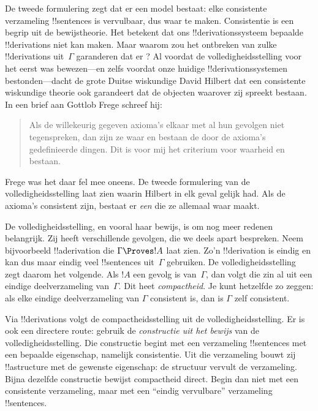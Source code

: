 \documentclass[openany]{memoir}
\begin{document}
De tweede formulering zegt dat er een model bestaat: elke consistente
verzameling !!{sentence}s is vervulbaar, dus waar te maken.
Consistentie is een begrip uit de bewijstheorie. Het betekent dat ons
!!{derivation}ssysteem bepaalde !!{derivation}s niet kan maken. Maar
waarom zou het ontbreken van zulke !!{derivation}s uit~$\Gamma$
garanderen dat er
? Al voordat
de volledigheidsstelling voor het eerst was bewezen---en zelfs voordat
onze huidige !!{derivation}ssystemen bestonden---dacht de grote Duitse
wiskundige David Hilbert dat een consistente wiskundige theorie ook
garandeert dat de objecten waarover zij spreekt bestaan. In een brief
aan Gottlob Frege schreef hij:
\begin{quote}
  Als de willekeurig gegeven axioma's elkaar met al hun gevolgen niet
  tegenspreken, dan zijn ze waar en bestaan de door de axioma's
  gedefinieerde dingen. Dit is voor mij het criterium voor waarheid en
  bestaan.
\end{quote}
Frege was het daar fel mee oneens. De tweede formulering van de
volledigheidsstelling laat zien waarin Hilbert in elk geval gelijk had.
Als de axioma's consistent zijn, bestaat er \emph{een}
 die ze allemaal waar maakt.

De volledigheidsstelling, en vooral haar bewijs, is om nog meer redenen
belangrijk. Zij heeft verschillende gevolgen, die we deels apart
bespreken. Neem bijvoorbeeld !!a{derivation} die
$\Gamma \Proves !A$ laat zien. Zo'n !!{derivation} is eindig en kan dus
maar eindig veel !!{sentence}s uit~$\Gamma$ gebruiken. De
volledigheidsstelling zegt daarom het volgende. Als $!A$ een gevolg is
van~$\Gamma$, dan volgt die zin al uit een eindige deelverzameling
van~$\Gamma$. Dit heet \emph{compactheid}. Je kunt hetzelfde zo zeggen:
als elke eindige deelverzameling van $\Gamma$ consistent is, dan is
$\Gamma$ zelf consistent.

Via !!{derivation}s volgt de compactheidsstelling uit de
volledigheidsstelling. Er is ook een directere route: gebruik de
\emph{constructie uit het bewijs} van de volledigheidsstelling. Die
constructie begint met een verzameling !!{sentence}s met een bepaalde
eigenschap, namelijk consistentie. Uit die verzameling bouwt zij
!!a{structure} met de gewenste eigenschap: de structuur vervult de
verzameling. Bijna dezelfde constructie bewijst compactheid direct.
Begin dan niet met een consistente verzameling, maar met een ``eindig
vervulbare'' verzameling !!{sentence}s.
\endgroup
\end{document}
